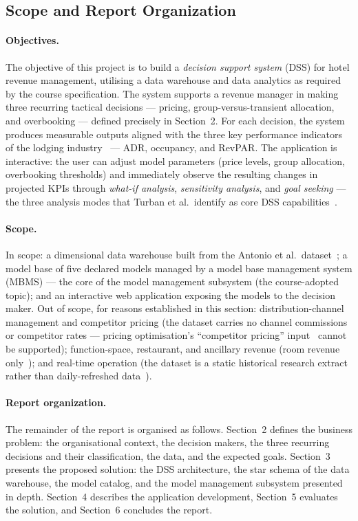 \subsection{Scope and Report Organization}

\paragraph{Objectives.}
The objective of this project is to build a \emph{decision support system} (DSS) for hotel revenue management, utilising a data warehouse and data analytics as required by the course specification. The system supports a revenue manager in making three recurring tactical decisions --- pricing, group-versus-transient allocation, and overbooking --- defined precisely in Section~2. For each decision, the system produces measurable outputs aligned with the three key performance indicators of the lodging industry~\cite{goeldner2009} --- ADR, occupancy, and RevPAR. The application is interactive: the user can adjust model parameters (price levels, group allocation, overbooking thresholds) and immediately observe the resulting changes in projected KPIs through \emph{what-if analysis}, \emph{sensitivity analysis}, and \emph{goal seeking} --- the three analysis modes that Turban et al.~identify as core DSS capabilities~\cite{turban2011}.

\paragraph{Scope.}
In scope: a dimensional data warehouse built from the Antonio et al.~dataset~\cite{antonio2019}; a model base of five declared models managed by a model base management system (MBMS) --- the core of the model management subsystem (the course-adopted topic); and an interactive web application exposing the models to the decision maker. Out of scope, for reasons established in this section: distribution-channel management and competitor pricing (the dataset carries no channel commissions or competitor rates --- pricing optimisation's ``competitor pricing'' input~\cite{amadeus2023} cannot be supported); function-space, restaurant, and ancillary revenue (room revenue only~\cite{goeldner2009}); and real-time operation (the dataset is a static historical research extract rather than daily-refreshed data~\cite{amadeus2023}).

\paragraph{Report organization.}
The remainder of the report is organised as follows. Section~2 defines the business problem: the organisational context, the decision makers, the three recurring decisions and their classification, the data, and the expected goals. Section~3 presents the proposed solution: the DSS architecture, the star schema of the data warehouse, the model catalog, and the model management subsystem presented in depth. Section~4 describes the application development, Section~5 evaluates the solution, and Section~6 concludes the report.

